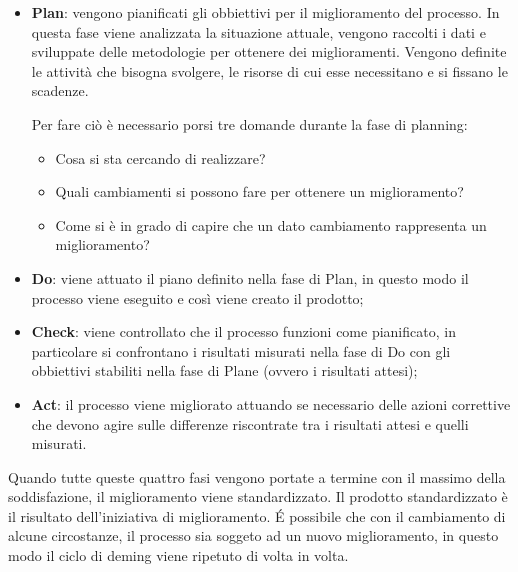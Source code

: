\begin{itemize}
	\item \textbf{Plan}: vengono pianificati gli obbiettivi per il miglioramento del processo. In questa fase viene analizzata la situazione attuale, vengono raccolti i dati e sviluppate delle metodologie per ottenere dei miglioramenti. Vengono definite le attività che bisogna svolgere, le risorse di cui esse necessitano e si fissano le scadenze.
	
	Per fare ciò è necessario porsi tre domande durante la fase di planning:
	\begin{itemize}
		\item Cosa si sta cercando di realizzare?
		\item Quali cambiamenti si possono fare per ottenere un miglioramento?
		\item Come si è in grado di capire che un dato cambiamento rappresenta un miglioramento?
	\end{itemize}

	\item \textbf{Do}: viene attuato il piano definito nella fase di Plan, in questo modo il processo viene eseguito e così viene creato il prodotto;
	
	\item \textbf{Check}: viene controllato che il processo funzioni come pianificato, in particolare si confrontano i risultati misurati nella fase di Do con gli obbiettivi stabiliti nella fase di Plane (ovvero i risultati attesi);
	
	\item \textbf{Act}: il processo viene migliorato attuando se necessario delle azioni correttive che devono agire sulle differenze riscontrate tra i risultati attesi e quelli misurati.
\end{itemize}

Quando tutte queste quattro fasi vengono portate a termine con il massimo della soddisfazione, il miglioramento viene standardizzato. Il prodotto standardizzato è il risultato dell'iniziativa di miglioramento. É possibile che con il cambiamento di alcune circostanze, il processo sia soggeto ad un nuovo miglioramento, in questo modo il ciclo di deming viene ripetuto di volta in volta.